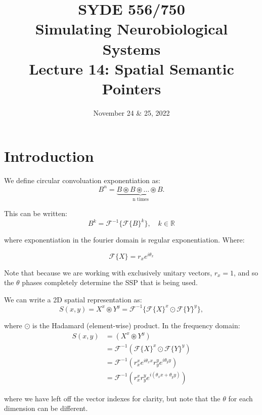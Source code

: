 \documentclass[10pt,letterpaper,oneside]{article}
\date{November 24 \& 25, 2022}
\title{SYDE 556/750 \\ Simulating Neurobiological Systems \\ Lecture 14: Spatial Semantic Pointers}
\begin{document}

\section{Introduction}


We define circular convoluation exponentiation as: 
\begin{equation}
  B^n = \underbrace{B \circledast B \circledast \dots \circledast B. }_{\text{n times}}
\end{equation}

This can be written: 
\begin{equation}
  B^k = \mathcal{F}^{-1}\{\mathcal{F}\{B\}^k\}, \quad k \in \mathbb{R}
\end{equation}

where exponentiation in the fourier domain is regular exponentiation.  Where: 

\begin{equation}
  \mathcal{F}\{ X\} = r_{x} e^{i \theta_{x}}
\end{equation}

Note that because we are working with exclusively unitary vectors, $r_x = 1$, and so the $\theta$ phases completely determine the SSP that is being used.  

We can write a 2D spatial representation as: 
\begin{equation}
  S(x,y) = X^x \circledast Y^y = \mathcal{F}^{-1}\{\mathcal{F}\{X\}^x\odot\mathcal{F} \{Y\}^y\},
\end{equation}

where $\odot$ is the Hadamard (element-wise) product. In the frequency domain: 
\begin{align}
  S(x, y) &= (X^{x} \circledast Y^{y}) \\
   &= \mathcal{F}^{-1}( \mathcal{F}\{ X\}^{x} \odot \mathcal{F}\{ Y\}^{y} ) \\
   &=  \mathcal{F}^{-1}(r_{x}^x e^{ i \theta_{x} x} r_{y}^y  e^{i \theta_{y} y })\\
   &=  \mathcal{F}^{-1}(r_{x}^x r_{y}^y e^{ i(\theta_{x} x + \theta_{y} y )})
\end{align}

where we have left off the vector indexes for clarity, but note that the $\theta$ for each dimension can be different.
\end{document}
